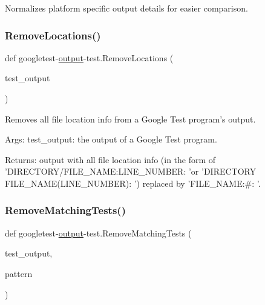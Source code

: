 \begin{DoxyVerb}Normalizes platform specific output details for easier comparison.\end{DoxyVerb}
 \mbox{\label{namespacegoogletest-output-test_a3efeac91fe31d59559f53c5888e64e82}} 
\subsubsection{\texorpdfstring{RemoveLocations()}{RemoveLocations()}}
{\footnotesize\ttfamily def googletest-\/\mbox{\hyperlink{namespacegoogletest-output-test_ab3df9ce09186215a36c30454cf282417}{output}}-\/test.\+Remove\+Locations (\begin{DoxyParamCaption}\item[{}]{test\+\_\+output }\end{DoxyParamCaption})}

\begin{DoxyVerb}Removes all file location info from a Google Test program's output.

Args:
     test_output:  the output of a Google Test program.

Returns:
     output with all file location info (in the form of
     'DIRECTORY/FILE_NAME:LINE_NUMBER: 'or
     'DIRECTORY\\FILE_NAME(LINE_NUMBER): ') replaced by
     'FILE_NAME:#: '.
\end{DoxyVerb}
 \mbox{\label{namespacegoogletest-output-test_a1ddcd0744bceeaaea8097047ee0cb1e6}} 
\subsubsection{\texorpdfstring{RemoveMatchingTests()}{RemoveMatchingTests()}}
{\footnotesize\ttfamily def googletest-\/\mbox{\hyperlink{namespacegoogletest-output-test_ab3df9ce09186215a36c30454cf282417}{output}}-\/test.\+Remove\+Matching\+Tests (\begin{DoxyParamCaption}\item[{}]{test\+\_\+output,  }\item[{}]{pattern }\end{DoxyParamCaption})}

